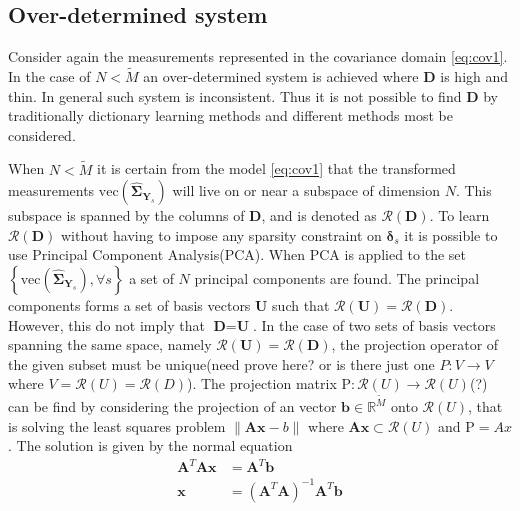 \subsection{Over-determined system}
Consider again the measurements represented in the covariance domain \eqref{eq:cov1}.
In the case of $N < \widetilde{M}$ an over-determined system is achieved where $\textbf{D}$ is high and thin. In general such system is inconsistent. Thus it is not possible to find $\textbf{D}$ by traditionally dictionary learning methods and different methods most be considered.

When $N < \widetilde{M}$ it is certain from the model \eqref{eq:cov1} that the transformed measurements $\text{vec}(\widehat{\boldsymbol{\Sigma}}_{\textbf{Y}_s})$ will live on or near a subspace of dimension $N$. 
This subspace is spanned by the columns of $\textbf{D}$, and is denoted as $\mathcal{R}(\textbf{D})$. 
To learn $\mathcal{R}(\textbf{D})$ without having to impose any sparsity constraint on $\boldsymbol{\delta}_s$ it is possible to use Principal Component Analysis(PCA). 
When PCA is applied to the set $\left\{\text{vec}(\widehat{\boldsymbol{\Sigma}}_{\textbf{Y}_s}), \forall s \right\}$ a set of $N$ principal components are found. The principal components forms a set of basis vectors $\textbf{U}$ such that $\mathcal{R}(\textbf{U})=\mathcal{R}(\textbf{D})$. 
However, this do not imply that $\textbf{D}=\textbf{U}$. 
In the case of two sets of basis vectors spanning the same space, namely $\mathcal{R}(\textbf{U})=\mathcal{R}(\textbf{D})$, the projection operator of the given subset must be unique(need prove here? or is there just one $P:V\rightarrow V $ where $V = \mathcal{R}(U)= \mathcal{R}(D)$). 
The projection matrix $\text{P}:\mathcal{R}(U)\rightarrow \mathcal{R}(U)$(?) can be find by considering the projection of an vector $\textbf{b}\in \mathbb{R}^{\widetilde{M}}$ onto $\mathcal{R}(U)$, that is solving the least squares problem $\| \textbf{Ax}-b\|$ where $\textbf{Ax}\subset \mathcal{R}(U)$ and $\text{P} = Ax$. The solution is given by the normal equation
\begin{align*}
\textbf{A}^T\textbf{A}\textbf{x} &= \textbf{A}^T\textbf{b}\\
\textbf{x} &= (\textbf{A}^T\textbf{A})^{-1}\textbf{A}^T\textbf{b}
\end{align*}	
